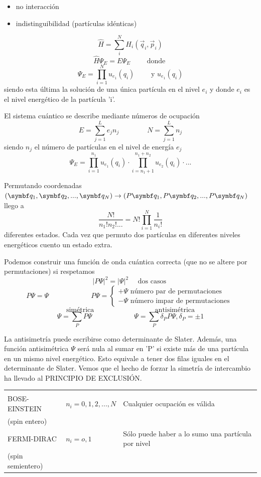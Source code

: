 \documentclass[10pt,oneside]{CBFT_book}
\begin{document}
\begin{itemize}
 \item no interacción
 \item indistinguibilidad (partículas idénticas)
\end{itemize}

\[
	\hat{H} = \sum_i^N H_i (\vec{q}_i , \vec{p}_i )
\]
\[
	\hat{H} \Psi_E = E \Psi_E \qquad \text{ donde }
\]
\[
	\Psi_E = \prod_{i=1}^{N} u_{e_1}(q_i) \qquad \text{ y } u_{e_1}(q_i)
\]
siendo esta última la solución de una única partícula en el nivel $e_i$ 
y donde $e_i$ es el nivel energético de la partícula 'i'.

El sistema cuántico se describe mediante números de ocupación
\[
	E = \sum_{j=1}^L e_j n_j  \qquad \qquad  N = \sum_{j=1}^L  n_j
\]
siendo $n_j$ el número de partículas en el nivel de energía $e_j$ 
\[
	\Psi_E = \prod_{i=1}^{n_1} u_{e_1}(q_i) \cdot \prod_{i = n_1 + 1 }^{ n_1 + n_2 } u_{e_2}(q_i) \cdot ...
\]

Permutando coordenadas $(\vb{q}_1,\vb{q}_2,...,\vb{q}_N ) \to (P\vb{q}_1,P\vb{q}_2,...,P\vb{q}_N)$ llego a
\[
	\frac{N!}{n_1!n_2!...} = N! \prod_{i=1}^N \frac{1}{n_i!}
\]
diferentes estados. Cada vez que permuto dos partículas en diferentes niveles energéticos cuento un estado extra.

Podemos construir una función de onda cuántica correcta (que no se altere por permutaciones) si respetamos
\[
	| P\Psi |^2 = | \Psi |^2 \quad \text{ dos casos }
\]
\[
	P\Psi = \Psi \qquad \qquad \qquad P\Psi = 
	\begin{cases}
	+ \Psi \text{ número par de permutaciones } \\ 
	- \Psi \text{ número impar de permutaciones } 
	\end{cases}
\]
\[
	\text{ simétrica } \qquad \qquad \qquad \qquad \text{ antisimétrica } 
\]
\[
	\Psi = \sum_P P\Psi \qquad \qquad \qquad \Psi = \sum_P \delta_P P\Psi, \delta_P = \pm 1
\]

La antisimetría puede escribirse como determinante de Slater. Además, una función antisimétrica $\Psi$ será nula 
al sumar en 'P' si existe más de una partícula en un mismo nivel energético. Esto equivale a tener dos filas
iguales en el determinante de Slater.
Vemos que el hecho de forzar la simetría de intercambio ha llevado al PRINCIPIO DE EXCLUSIÓN.

\begin{center}
\begin{tabular}{|l|l|l|}
\hline
 & & \\
BOSE-EINSTEIN & $ n_i = 0,1,2, ... , N $ & Cualquier ocupación es válida \\
 (spin entero) & & \\
FERMI-DIRAC  & $ n_i = o, 1 $ & Sólo puede haber a lo sumo una partícula por nivel \\
 (spin semientero) & & \\
\hline
\end{tabular}
\end{center}
\end{document}
